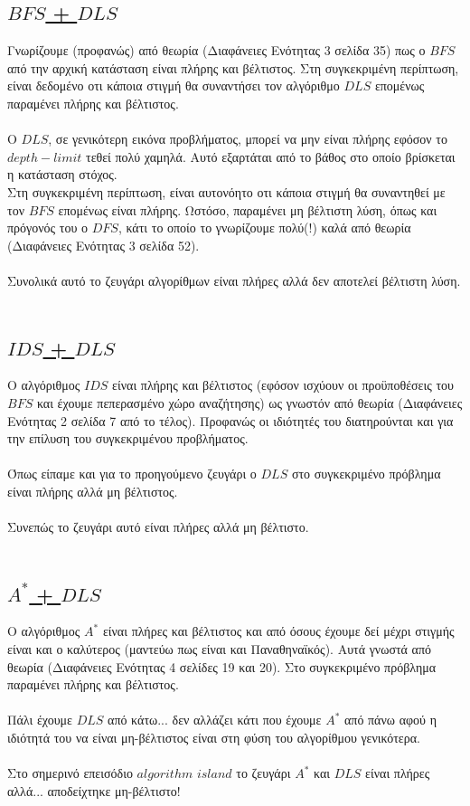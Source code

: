 \documentclass[12pt]{article}
\begin{document}
\subsection*{\underline{$BFS$ + $DLS$}}
Γνωρίζουμε (προφανώς) από θεωρία (Διαφάνειες Ενότητας 3 σελίδα 35) πως ο $BFS$ από την αρχική κατάσταση είναι πλήρης και βέλτιστος. Στη συγκεκριμένη περίπτωση, είναι δεδομένο οτι κάποια στιγμή θα συναντήσει τον αλγόριθμο $DLS$ επομένως παραμένει πλήρης και βέλτιστος.\\\\
O $DLS$, σε γενικότερη εικόνα προβλήματος, μπορεί να μην είναι πλήρης εφόσον το $depth-limit$ τεθεί πολύ χαμηλά. Αυτό εξαρτάται από το βάθος στο οποίο βρίσκεται η κατάσταση στόχος.\\
Στη συγκεκριμένη περίπτωση, είναι αυτονόητο οτι κάποια στιγμή θα συναντηθεί με τον $BFS$ επομένως είναι πλήρης. Ωστόσο, παραμένει μη βέλτιστη λύση, όπως και πρόγονός του ο $DFS$,  κάτι το οποίο το γνωρίζουμε πολύ(!) καλά από θεωρία (Διαφάνειες Ενότητας 3 σελίδα 52).\\\\
Συνολικά αυτό το ζευγάρι αλγορίθμων είναι πλήρες αλλά δεν αποτελεί βέλτιστη λύση.\\\\
\subsection*{\underline{$IDS$ + $DLS$}}
Ο αλγόριθμος $IDS$ είναι πλήρης και βέλτιστος (εφόσον ισχύουν οι προϋποθέσεις του $BFS$ και έχουμε πεπερασμένο χώρο αναζήτησης) ως γνωστόν από θεωρία (Διαφάνειες Ενότητας 2 σελίδα 7 από το τέλος). Προφανώς οι ιδιότητές του διατηρούνται και για την επίλυση του συγκεκριμένου προβλήματος.\\\\
Όπως είπαμε και για το προηγούμενο ζευγάρι ο $DLS$ στο συγκεκριμένο πρόβλημα είναι πλήρης αλλά μη βέλτιστος.\\\\
Συνεπώς το ζευγάρι αυτό είναι πλήρες αλλά μη βέλτιστο.\\\\
\subsection*{\underline{$A^*$ + $DLS$}}
Ο αλγόριθμος $A^*$ είναι πλήρες και βέλτιστος και από όσους έχουμε δεί μέχρι στιγμής είναι και ο καλύτερος (μαντεύω πως είναι και Παναθηναϊκός). Αυτά γνωστά από θεωρία (Διαφάνειες Ενότητας 4 σελίδες 19 και 20). Στο συγκεκριμένο πρόβλημα παραμένει πλήρης και βέλτιστος.\\\\
Πάλι έχουμε $DLS$ από κάτω... δεν αλλάζει κάτι που έχουμε $A^*$ από πάνω αφού η ιδιότητά του να είναι μη-βέλτιστος είναι στη φύση του αλγορίθμου γενικότερα.\\\\
Στο σημερινό επεισόδιο $algorithm$  $island$ το ζευγάρι $A^*$ και $DLS$ είναι πλήρες αλλά... αποδείχτηκε μη-βέλτιστο!\\\\
\end{document}
